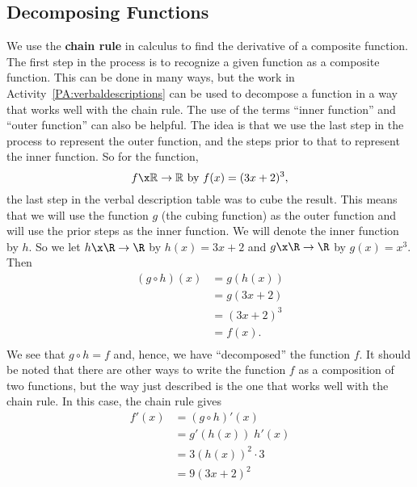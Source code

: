 \subsection*{Decomposing Functions} %

We use the \textbf{chain rule}
%
 in calculus to find the derivative of a composite function.  The first step in the process is to recognize a given function as a composite function.  This can be done in many ways, but the work in \typeu Activity~\ref*{PA:verbaldescriptions} can be used to decompose a function in a way that works well with the chain rule.  The use of the terms ``inner function'' and ``outer function'' can also be helpful.  The idea is that we use the last step in the process to represent the outer function, and the steps prior to that to represent the inner function.  So for the function, 
\[
f\x \mathbb{R} \to \mathbb{R}\text{  by  }f( x ) = ( {3x + 2} )^3 ,
\]
the last step in the verbal description table was to cube the result.  This means that we will use the function  $g$ (the cubing function) as the outer function and will use the prior steps as the inner function.  We will denote the inner function by  $h$.  So we let  $h\x \R \to \R$ by  
$h( x ) = 3x + 2$ and  $g\x \R \to \R$ by  $g( x ) = x^3 $.  Then
\begin{align*}
  ( {g \circ h} )( x ) &= g\left( {h( x )} \right) \\ 
                       &= g( {3x + 2} ) \\ 
                       &= ( {3x + 2} )^3  \\ 
                       &= f( x ). \\ 
\end{align*}
We see that  $g \circ h = f$\! and, hence, we have  ``decomposed''  the function  $f$.  It should be noted that there are other ways to write the function $f$ as a composition of two functions, but the way just described is the one that works well with the chain rule.  In this case, the chain rule gives
\begin{align*}
f'(x) &= ( g \circ h )'(x) \\
      &= g'(h(x))\; h'(x) \\
      &= 3(h(x))^2 \cdot 3 \\
      &= 9 (3x + 2)^2
\end{align*}

